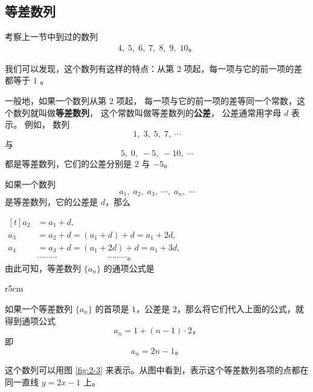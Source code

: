 \subsection{等差数列}\label{subsec:2-2}

考察上一节中到过的数列
\begin{gather}
    4,\; 5,\; 6,\; 7,\; 8,\; 9,\; 10 \text{。} \tag{$1$}\label{eq:shulie-1-ref}
\end{gather}

我们可以发现，这个数列有这样的特点：从第 $2$ 项起，每一项与它的前一项的差都等于 $1$ 。

一般地，如果一个数列从第 $2$ 项起， 每一项与它的前一项的差等同一个常数，这个数列就叫做\textbf{等差数列}，
这个常数叫做等差数列的\textbf{公差}， 公差通常用字母 $d$ 表示。 例如， 数列
$$ 1,\; 3,\; 5,\; 7,\; \cdots $$
与
$$ 5,\; 0,\; -5,\; -10,\; \cdots $$
都是等差数列，它们的公差分别是 $2$ 与 $-5$。

如果一个数列
$$ a_1,\; a_2,\; a_3,\; \cdots ,\; a_n,\; \cdots $$
是等差数列，它的公差是 $d$，那么

$\begin{aligned}[t]
    a_2 &= a_1 + d, \\
    a_3 &= a_2 + d = (a_1 + d) + d = a_1 + 2d, \\
    a_4 &= a_3 + d = (a_1 + 2d) + d = a_1 + 3d, \\
    &\cdots\cdots\cdots \qquad\qquad\qquad \cdots\cdots\cdots \text{。}
\end{aligned}$\\
由此可知，等差数列 $\{a_n\}$ 的通项公式是
\begin{center}
\end{center}


\begin{wrapfigure}[22]{r}{5cm}
    \centering
    
    \caption{}\label{fig:2-3}
\end{wrapfigure}

如果一个等差数列 $\{a_n\}$ 的首项是 $1$，公差是 $2$，那么将它们代入上面的公式，就得到通项公式
$$ a_n = 1 + (n - 1) \cdot 2 \text{，}$$
即
$$ a_n = 2n - 1 \text{。}$$

这个数列可以用图 \ref{fig:2-3} 来表示。从图中看到，表示这个等差数列各项的点都在同一直线 $y = 2x - 1$ 上。

